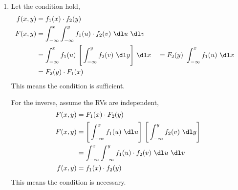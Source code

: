 \begin{enumerate}
    \item Let the condition hold,
          \begin{align}
              f(x,y)  & = f_1(x) \cdot f_2(y)                                       \\
              F(x, y) & = \int_{-\infty}^{x} \int_{-\infty}^{y} f_1(u) \cdot f_2(v)
              \ \dl u\ \dl v                                                        \\
                      & = \int_{-\infty}^{x} f_1(u)\ \Bigg[\int_{-\infty}^{y}
                  f_2(v)\ \dl y\Bigg]\ \dl x
                      &
                      & = F_2(y)\ \int_{-\infty}^{x} f_1(u)\ \dl x                  \\
                      & = F_2(y) \cdot F_1(x)
          \end{align}
          This means the condition is sufficient. \par
          For the inverse, assume the RVs are independent,
          \begin{align}
              F(x, y) & = F_1(x) \cdot F_2(y)                                       \\
              F(x, y) & = \Bigg[\int_{-\infty}^{x} f_1(u)\ \dl u\Bigg]
              \ \Bigg[\int_{-\infty}^{y} f_2(v)\ \dl y\Bigg]                        \\
                      & = \int_{-\infty}^{x} \int_{-\infty}^{y} f_1(u) \cdot f_2(v)
              \ \dl u\ \dl v                                                        \\
              f(x, y) & = f_1(x) \cdot f_2(y)
          \end{align}
          This means the condition is necessary.
\end{enumerate}